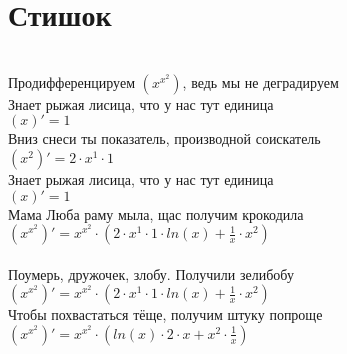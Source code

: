 \documentclass[a4paper,12pt]{article}
\begin{document}
\section*{Стишок}\\
Продифференцируем $(x ^{x ^{2} } )$, ведь мы не деградируем\\
Знает рыжая лисица, что у нас тут единица\\
\begin{math}
	(x)' = 1
\end{math}\\
Вниз снеси ты показатель, производной соискатель\\
\begin{math}
	(x ^{2} )' = 2 \cdot x ^{1}  \cdot 1
\end{math}\\
Знает рыжая лисица, что у нас тут единица\\
\begin{math}
	(x)' = 1
\end{math}\\
Мама Люба раму мыла, щас получим крокодила\\
\begin{math}
	(x ^{x ^{2} } )' = x ^{x ^{2} }  \cdot (2 \cdot x ^{1}  \cdot 1 \cdot  ln (x)  +  \frac{1}{x}  \cdot x ^{2} )
\end{math}\\
\\Поумерь, дружочек, злобу. Получили зелибобу\\ $(x ^{x ^{2} } )' = x ^{x ^{2} }  \cdot (2 \cdot x ^{1}  \cdot 1 \cdot  ln (x)  +  \frac{1}{x}  \cdot x ^{2} )$\\
Чтобы похвастаться тёще, получим штуку попроще\\
$(x ^{x ^{2} } )' = x ^{x ^{2} }  \cdot ( ln (x)  \cdot 2 \cdot x + x ^{2}  \cdot  \frac{1}{x} )$\\
\end{document}

